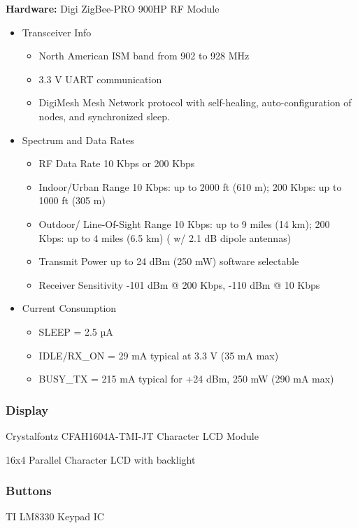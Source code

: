 \documentclass[journal,compsoc]{IEEEtran}
\begin{document}
\textbf {Hardware:} Digi ZigBee-PRO 900HP RF Module

\begin{itemize}
  \item Transceiver Info
    \begin{itemize}
      \item North American ISM band from 902 to 928 MHz
      \item 3.3 V UART communication
      \item DigiMesh Mesh Network protocol with self-healing, auto-configuration of nodes, and synchronized sleep.
    \end{itemize}
  \item Spectrum and Data Rates
    \begin{itemize}
      \item RF Data Rate  10 Kbps or 200 Kbps
      \item Indoor/Urban Range  10 Kbps: up to 2000 ft (610 m); 200 Kbps: up to 1000 ft (305 m)
      \item Outdoor/ Line-Of-Sight Range  10 Kbps: up to 9 miles (14 km); 200 Kbps: up to 4 miles (6.5 km) ( w/ 2.1 dB dipole antennas)
      \item Transmit Power up to 24 dBm (250 mW) software selectable
      \item Receiver Sensitivity  -101 dBm @ 200 Kbps, -110 dBm @ 10 Kbps
    \end{itemize}
  \item Current Consumption
    \begin{itemize}
      \item SLEEP = 2.5 µA
      \item IDLE/RX\_ON = 29 mA typical at 3.3 V (35 mA max)
      \item BUSY\_TX = 215 mA typical for +24 dBm, 250 mW (290 mA max)
    \end{itemize}
\end{itemize}

\subsubsection{Display}

Crystalfontz CFAH1604A-TMI-JT Character LCD Module

16x4 Parallel Character LCD with backlight

\subsubsection{Buttons}
TI LM8330 Keypad IC
\end{document}
